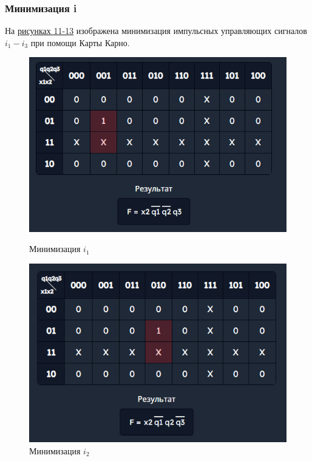 \documentclass[10pt,a4paper,final]{article} %
\begin{document}
\subsubsection{Минимизация i}
На \hyperref[i]{рисунках 11-13} изображена минимизация импульсных управляющих сигналов $i_1 - i_3$  при помощи Карты Карно.

\newpage
\begin{figure}[htpb]
	\centering
	\begin{minipage}{0.3\textwidth}
		\includegraphics[scale=0.45]{img/i1.png}
		\caption{Минимизация $i_1$}
	\end{minipage}
	\hfill
	\begin{minipage}{0.3\textwidth}
		\includegraphics[scale=0.45]{img/i2.png}
		\caption{Минимизация $i_2$}
	\end{minipage}
	\hfill
	\begin{minipage}{0.3\textwidth}

\end{minipage}
\end{figure}
\end{document}
